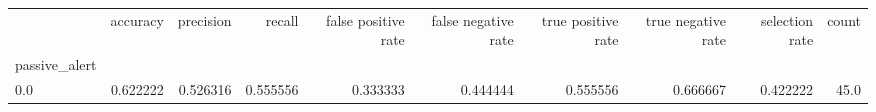 \begin{tabular}{lrrrrrrrrr}
\toprule
{} &  accuracy &  precision &    recall &  false positive rate &  false negative rate &  true positive rate &  true negative rate &  selection rate &  count \\
passive\_alert &           &            &           &                      &                      &                     &                     &                 &        \\
\midrule
0.0           &  0.622222 &   0.526316 &  0.555556 &             0.333333 &             0.444444 &            0.555556 &            0.666667 &        0.422222 &   45.0 \\
\bottomrule
\end{tabular}
